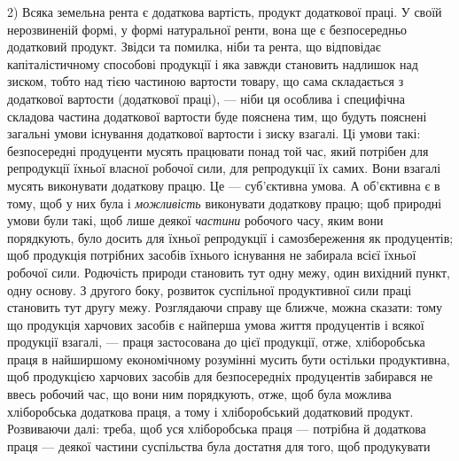 2) Всяка земельна рента є додаткова вартість, продукт додаткової праці.
У своїй нерозвиненій формі, у формі натуральної ренти, вона ще є безпосередньо
додатковий продукт. Звідси та помилка, ніби та рента, що відповідає капіталістичному
способові продукції і яка завжди становить надлишок над зиском,
тобто над тією частиною вартости товару, що сама складається з додаткової вартости
(додаткової праці), — ніби ця особлива і специфічна складова частина додаткової
вартости буде пояснена тим, що будуть пояснені загальні умови існування додаткової
вартости і зиску взагалі. Ці умови такі: безпосередні продуценти мусять працювати
понад той час, який потрібен для репродукції їхньої власної робочої
сили, для репродукції їх самих. Вони взагалі мусять виконувати додаткову працю.
Це — суб’єктивна умова. А об’єктивна є в тому, щоб у них була і \emph{можливість}
виконувати додаткову працю; щоб природні умови були такі, щоб лише деякої
\emph{частини} робочого часу, яким вони порядкують, було досить для їхньої репродукції
і самозбереження як продуцентів; щоб продукція потрібних засобів їхнього
існування не забирала всієї їхньої робочої сили. Родючість природи становить
тут одну межу, один вихідний пункт, одну основу. З другого боку, розвиток суспільної
продуктивної сили праці становить тут другу межу. Розглядаючи справу
ще ближче, можна сказати: тому що продукція харчових засобів є найперша умова
життя продуцентів і всякої продукції взагалі, — праця застосована до цієї продукції,
отже, хліборобська праця в найширшому економічному розумінні мусить бути
остільки продуктивна, щоб продукцією харчових засобів для безпосередніх продуцентів
забирався не ввесь робочий час, що вони ним порядкують, отже, щоб була
можлива хліборобська додаткова праця, а тому і хліборобський додатковий продукт.
Розвиваючи далі: треба, щоб уся хліборобська праця — потрібна й додаткова
праця — деякої частини суспільства була достатня для того, щоб продукувати
\parbreak{}  %
